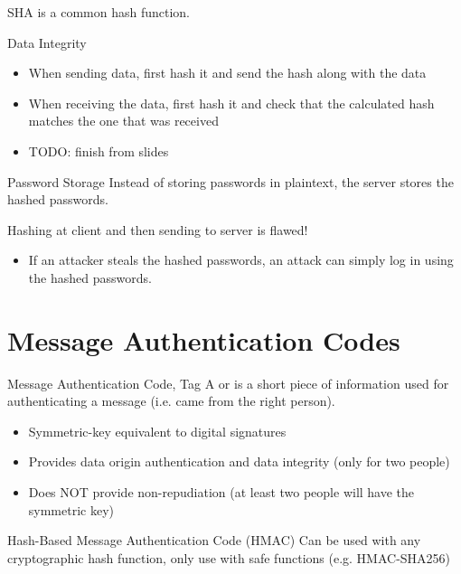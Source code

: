 \documentclass[code]{amznotes}
\begin{document}
\begin{dfnbox}{SHA}{}
     is a common hash function.
\end{dfnbox}

\begin{exbox}{Data Integrity}{}
    \begin{itemize}
        \item When sending data, first hash it and send the hash along with the data
        \item When receiving the data, first hash it and check that the calculated hash matches the one that was received
        \item TODO: finish from slides
    \end{itemize}
\end{exbox}

\begin{exbox}{Password Storage}{}
    Instead of storing passwords in plaintext, the server stores the hashed passwords.

    Hashing at client and then sending to server is flawed!
    \begin{itemize}
        \item If an attacker steals the hashed passwords, an attack can simply log in using the hashed passwords.
    \end{itemize}
\end{exbox}

\section{Message Authentication Codes}

\begin{dfnbox}{Message Authentication Code, Tag}{}
    A  or  is a short piece of information used for authenticating a message (i.e. came from the right person).
\end{dfnbox}

\begin{itemize}[noitemsep]
    \item Symmetric-key equivalent to digital signatures
    \item Provides data origin authentication and data integrity (only for two people)
    \item Does NOT provide non-repudiation (at least two people will have the symmetric key)
\end{itemize}

\begin{dfnbox}{Hash-Based Message Authentication Code (HMAC)}{}
    Can be used with any cryptographic hash function, only use with safe functions (e.g. HMAC-SHA256)
\end{dfnbox}
\end{document}

